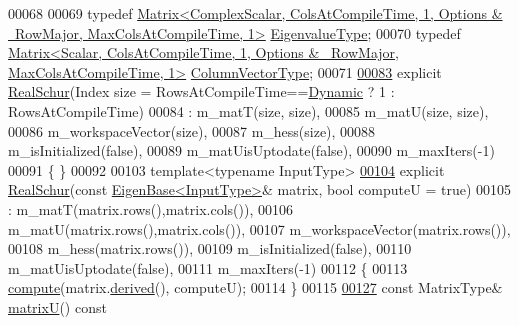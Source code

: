 \begin{DoxyCode}
00068 
00069     \textcolor{keyword}{typedef} 
      \hyperlink{group___core___module}{Matrix<ComplexScalar, ColsAtCompileTime, 1, Options & ~RowMajor, MaxColsAtCompileTime, 1>}
       \hyperlink{group___core___module}{EigenvalueType};
00070     \textcolor{keyword}{typedef} 
      \hyperlink{group___core___module}{Matrix<Scalar, ColsAtCompileTime, 1, Options & ~RowMajor, MaxColsAtCompileTime, 1>}
       \hyperlink{group___core___module}{ColumnVectorType};
00071 
\hyperlink{group___eigenvalues___module_a826c83e2f1d4c8332606a14ea121ff5f}{00083}     \textcolor{keyword}{explicit} \hyperlink{group___eigenvalues___module_a826c83e2f1d4c8332606a14ea121ff5f}{RealSchur}(Index size = RowsAtCompileTime==\hyperlink{namespace_eigen_ad81fa7195215a0ce30017dfac309f0b2}{Dynamic} ? 1 : RowsAtCompileTime)
00084             : m\_matT(size, size),
00085               m\_matU(size, size),
00086               m\_workspaceVector(size),
00087               m\_hess(size),
00088               m\_isInitialized(false),
00089               m\_matUisUptodate(false),
00090               m\_maxIters(-1)
00091     \{ \}
00092 
00103     \textcolor{keyword}{template}<\textcolor{keyword}{typename} InputType>
\hyperlink{group___eigenvalues___module_afef4d3dc5a493aca2760c20b34337016}{00104}     \textcolor{keyword}{explicit} \hyperlink{group___eigenvalues___module_afef4d3dc5a493aca2760c20b34337016}{RealSchur}(\textcolor{keyword}{const} \hyperlink{group___core___module_struct_eigen_1_1_eigen_base}{EigenBase<InputType>}& matrix, \textcolor{keywordtype}{bool} computeU = \textcolor{keyword}{
      true})
00105             : m\_matT(matrix.rows(),matrix.cols()),
00106               m\_matU(matrix.rows(),matrix.cols()),
00107               m\_workspaceVector(matrix.rows()),
00108               m\_hess(matrix.rows()),
00109               m\_isInitialized(false),
00110               m\_matUisUptodate(false),
00111               m\_maxIters(-1)
00112     \{
00113       \hyperlink{group___eigenvalues___module_a60caf9ffad11d728ea458c4dd36d0a98}{compute}(matrix.\hyperlink{group___core___module_a324b16961a11d2ecfd2d1b7dd7946545}{derived}(), computeU);
00114     \}
00115 
\hyperlink{group___eigenvalues___module_a85622ccbecff99c8933d21f0a22b22bb}{00127}     \textcolor{keyword}{const} MatrixType& \hyperlink{group___eigenvalues___module_a85622ccbecff99c8933d21f0a22b22bb}{matrixU}()\textcolor{keyword}{ const}

\end{DoxyCode}

